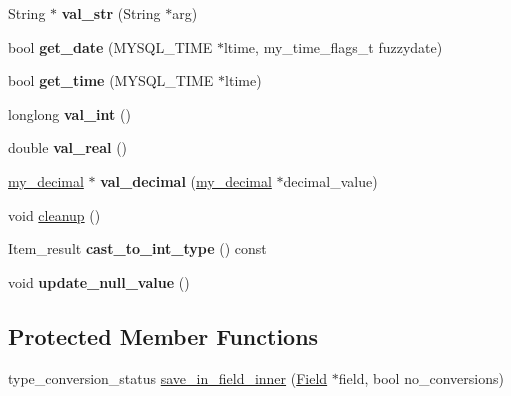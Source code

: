 \begin{DoxyCompactItemize}
String $\ast$ {\bfseries val\+\_\+str} (String $\ast$arg)
\item 
\mbox{\label{classItem__json__func_a1c9b0374aea309aee034281df9455e22}} 
bool {\bfseries get\+\_\+date} (M\+Y\+S\+Q\+L\+\_\+\+T\+I\+ME $\ast$ltime, my\+\_\+time\+\_\+flags\+\_\+t fuzzydate)
\item 
\mbox{\label{classItem__json__func_a48497edef211e5a5c3b65cece6bc168a}} 
bool {\bfseries get\+\_\+time} (M\+Y\+S\+Q\+L\+\_\+\+T\+I\+ME $\ast$ltime)
\item 
\mbox{\label{classItem__json__func_a1b9bf1ec945821014ace4a5a6a9ac657}} 
longlong {\bfseries val\+\_\+int} ()
\item 
\mbox{\label{classItem__json__func_a21d49061e21733f020c7fd22fb2f0044}} 
double {\bfseries val\+\_\+real} ()
\item 
\mbox{\label{classItem__json__func_a52581f7f4224a7b70da5c7f4759c360b}} 
\mbox{\hyperlink{classmy__decimal}{my\+\_\+decimal}} $\ast$ {\bfseries val\+\_\+decimal} (\mbox{\hyperlink{classmy__decimal}{my\+\_\+decimal}} $\ast$decimal\+\_\+value)
\item 
void \mbox{\hyperlink{classItem__json__func_a848300ad1b593a1ec577a3e0cafd68dd}{cleanup}} ()
\item 
\mbox{\label{classItem__json__func_a497cebfb98b9c5515498f9cca1a96e10}} 
Item\+\_\+result {\bfseries cast\+\_\+to\+\_\+int\+\_\+type} () const
\item 
\mbox{\label{classItem__json__func_aa986520e80eed0648b9cf9071c20cf06}} 
void {\bfseries update\+\_\+null\+\_\+value} ()
\end{DoxyCompactItemize}
\subsection*{Protected Member Functions}
\begin{DoxyCompactItemize}
\item 
type\+\_\+conversion\+\_\+status \mbox{\hyperlink{classItem__json__func_ac8bf3b1104bbbe70d1ec9f4f2bc13fb4}{save\+\_\+in\+\_\+field\+\_\+inner}} (\mbox{\hyperlink{classField}{Field}} $\ast$field, bool no\+\_\+conversions)
\end{DoxyCompactItemize}
